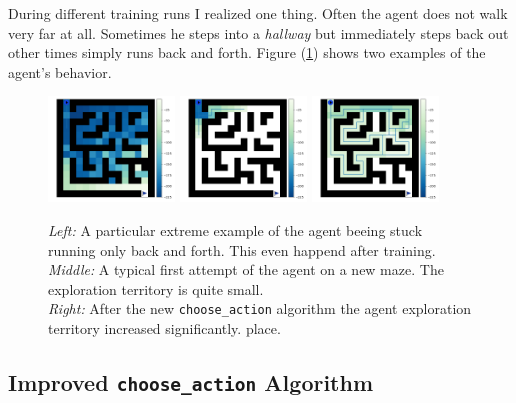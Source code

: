 \documentclass[12pt,a4paper]{scrartcl}
\begin{document}
During different training runs I realized one thing. Often the agent does not
walk very far at all. Sometimes he steps into a \textit{hallway} but immediately
steps back out other times simply runs back and forth. Figure
(\ref{fig:choose_action2}) shows two examples of the agent's behavior.

\begin{figure}[htbp]
    \centering
    \includegraphics[width=0.3\textwidth]{algorithms/bad_exploration_example.png}
    \includegraphics[width=0.3\textwidth]{algorithms/choose_big_maze_N1_lr0.15_er0.30_dr0.99000.png}
    \includegraphics[width=0.3\textwidth]{algorithms/choose2_big_maze_N1_lr0.15_er0.30_dr0.99000.png}
    \caption{
        \textit{Left:} A particular extreme example of the agent beeing stuck
        running only back and forth. This even happend after training. \\
        \textit{Middle:} A typical first attempt of the agent on a new maze.
        The exploration territory is quite small. \\
        \textit{Right:} After the new \texttt{choose\_action} algorithm the
        agent exploration territory increased significantly.
    place.}
    \label{fig:choose_action2}
\end{figure}

\subsection{Improved \texttt{choose\_action} Algorithm}
\label{sec:choose_action2}
\end{document}
